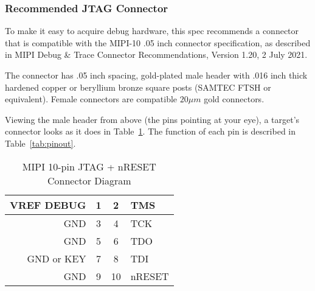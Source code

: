 \subsubsection{Recommended JTAG Connector}

To make it easy to acquire debug hardware, this spec recommends a connector
that is compatible with the MIPI-10 .05 inch connector specification, as described
in MIPI Debug \& Trace Connector Recommendations, Version 1.20, 2 July 2021.

The connector has .05 inch spacing, gold-plated male header with .016 inch thick
hardened copper or beryllium bronze square posts (SAMTEC FTSH or equivalent).
Female connectors are compatible $20\mu m$ gold connectors.

Viewing the male header from above (the pins pointing at your eye), a target's
connector looks as it does in Table~\ref{tab:mipiten}.  The function of each pin
is described in Table~\ref{tab:pinout}.

\begin{table}[H]
    \centering
    \caption{MIPI 10-pin JTAG + nRESET Connector Diagram}
    \label{tab:mipiten}
    \begin{tabular}{|r|c|c|l|}
        \hline
        VREF DEBUG & 1 & 2 & TMS \\
        \hline
        GND & 3 & 4 & TCK \\
        \hline
        GND & 5 & 6 & TDO \\
        \hline
        GND or KEY & 7 & 8 & TDI \\
        \hline
        GND & 9 & 10 & nRESET \\
        \hline
    \end{tabular}
\end{table}

